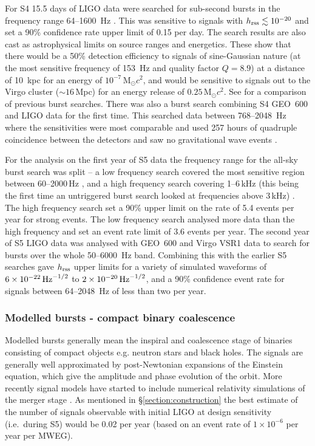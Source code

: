\documentclass{article}
\begin{document}
For S4 15.5 days of LIGO data were searched for sub-second bursts in the
frequency range 64--1600~Hz \cite{Abbott:2007b}. This was sensitive to signals
with $h_{\rm rss}\lesssim10^{-20}$ and set a 90\% confidence rate upper limit of
0.15 per day. The search results are also cast as astrophysical limits on source
ranges and energetics. These show that there would be a 50\% detection
efficiency to signals of sine-Gaussian nature (at the most sensitive frequency
of 153~Hz and quality factor $Q=8.9$) at a distance of 10~kpc for an energy of
$10^{-7}$\,M$_{\odot}c^2$, and would be sensitive to signals out to the Virgo
cluster ($\sim16$\,Mpc) for an energy release of $0.25$\,M$_{\odot}c^2$. See
\cite{Abbott:2007b} for a comparison of previous burst searches. There was also
a burst search combining S4 GEO~600 and LIGO data for the first time. This
searched data between 768--2048~Hz where the sensitivities were most comparable
and used 257 hours of quadruple coincidence between the detectors and saw no
gravitational wave events \cite{Abbott:2008b}.

For the analysis on the first year of S5 data the frequency range for the
all-sky burst search was split -- a low frequency search covered the most
sensitive region between 60--2000\,Hz \cite{Abbott:2009h}, and a high frequency
search covering 1--6\,kHz (this being the first time an untriggered burst search
looked at frequencies above 3\,kHz) \cite{Abbott:2009i}. The high frequency
search set a 90\% upper limit on the rate of 5.4 events per year for strong
events. The low frequency search analysed more data than the high frequency and
set an event rate limit of 3.6 events per year. The second year of S5 LIGO data
was analysed with GEO~600 and Virgo VSR1 data \cite{Abadie:2010d} to search for 
bursts over the whole 50--6000~Hz band. Combining this with the earlier S5 
searches gave $h_{\rm rss}$ upper limits for a variety of simulated waveforms of
$6\times10^{-22}\,{\rm Hz}^{-1/2}$ to $2\times10^{-20}\,{\rm Hz}^{-1/2}$, and a
90\% confidence event rate for signals between 64--2048~Hz of less than two per
year.

\subsubsection{Modelled bursts - compact binary coalescence}\label{sec:cbc}
Modelled bursts generally mean the inspiral and coalescence stage of binaries
consisting of compact objects e.g. neutron stars and black holes. The signals
are generally well approximated by post-Newtonian expansions of the Einstein
equation, which give the amplitude and phase evolution of the orbit. More 
recently signal models have started to include numerical relativity simulations
of the merger stage \cite{Aylott:2009}. As mentioned in
\S\ref{section:construction} the best estimate of the number of signals
observable with initial LIGO at design sensitivity (i.e.~during S5) would be
0.02 per year (based on an event rate of $1\times10^{-6}$ per year per MWEG). 
\end{document}
